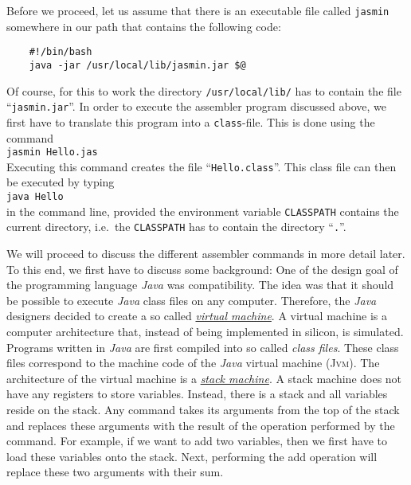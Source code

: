 Before we proceed, let us assume that there is an executable file called \texttt{jasmin}
somewhere in our path that contains the following code:
\begin{verbatim}
    #!/bin/bash 
    java -jar /usr/local/lib/jasmin.jar $@
\end{verbatim}
Of course, for this to work the directory \texttt{/usr/local/lib/} has to contain the file
``\texttt{jasmin.jar}''.
In order to execute the assembler program discussed above, we first have to translate this program into a  
\texttt{class}-file.  This is done using the command
\\[0.2cm]
\hspace*{1.3cm}
\texttt{jasmin Hello.jas}
\\[0.2cm]
Executing this command creates the file ``\texttt{Hello.class}''.  This class file
can then be executed by typing
\\[0.2cm]
\hspace*{1.3cm}
\texttt{java Hello}
\\[0.2cm]
in the command line, provided the environment variable \texttt{CLASSPATH} contains the current
directory, i.e.~the \texttt{CLASSPATH} has to contain the directory ``\texttt{.}''.

We will proceed to discuss the different assembler commands in more detail later.  To this end, we
first have to discuss some background: One of the design goal of the programming language
\textsl{Java} was compatibility.  The idea was 
that it should be possible to execute \textsl{Java} class files on any computer.  Therefore, the
\textsl{Java} designers decided to create a so called 
\href{http://en.wikipedia.org/wiki/Virtual_machine}{\emph{virtual machine}}.  A virtual machine is
a computer architecture that, instead of being implemented in silicon, is simulated. 
Programs written in \textsl{Java} are first compiled into so called \emph{class files}.  These class
files correspond to the machine code of the \textsl{Java} virtual machine (\textsc{Jvm}).  
The architecture of the virtual machine is a 
\href{http://en.wikipedia.org/wiki/Stack_machine}{\emph{stack machine}}. 
A stack machine does not have any registers to store variables.  Instead, there is a stack and all
variables reside on the stack.  Any command takes its arguments from the top of the stack and
replaces these arguments with the result of the operation performed by the command.
For example, if we want to add two variables, then we first have to
load these variables onto the stack.  Next, performing the add operation will replace these two
arguments with their sum.


